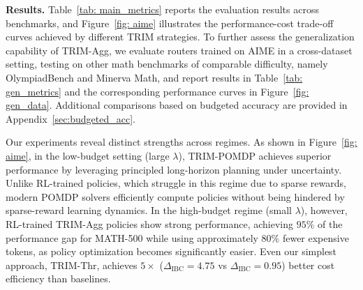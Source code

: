 \documentclass{article}
\theoremstyle{plain}
\theoremstyle{definition}
\theoremstyle{remark}
\newcommand{\ignore}[1]{}
\begin{document}
\textbf{Results.} Table~\ref{tab: main_metrics} reports the evaluation results across benchmarks, and Figure~\ref{fig: aime} illustrates the performance-cost trade-off curves achieved by different TRIM strategies. To further assess the generalization capability of TRIM-Agg, we evaluate routers trained on AIME in a cross-dataset setting, testing on other math benchmarks of comparable difficulty, namely OlympiadBench and Minerva Math, and report results in Table~\ref{tab: gen_metrics} and the corresponding performance curves in Figure~\ref{fig: gen_data}. Additional comparisons based on budgeted accuracy are provided in Appendix~\ref{sec:budgeted_acc}.

\ignore{Our experiments reveal distinct strengths across regimes. In the low-budget setting (large $\lambda$), TRIM-POMDP achieves superior performance, benefiting from principled long-horizon planning under uncertainty. Unlike RL-trained policies, which struggle in this regime due to sparse rewards, modern POMDP solvers efficiently compute policies without being hindered by sparse-reward learning dynamics. In the high-budget regime, however, RL-trained TRIM-Agg policies show strong performance, as policy optimization becomes significantly easier. Beyond budget regimes, our cross-dataset evaluations highlight an important distinction: query-level routers can often overfit to the intrinsic characteristics of specific datasets, while TRIM captures transferable routing behaviors that generalize across benchmarks of comparable difficulty. This suggests that step-level difficulty patterns reflect fundamental properties of multi-step reasoning rather than artifacts of individual datasets or models.

Despite being trained on fewer than 500 samples from the AIME dataset, TRIM-Agg achieves strong performance on the held-out test set and exhibits robust generalization to datasets of comparable difficulty, consistently surpassing both TRIM-Thr and query-level baselines. In parallel, TRIM-POMDP shows strong performance across all cost–performance trade-off regimes on both MATH-500 and AIME, despite its observation function being trained on different (but comparably difficult) math datasets and the solver requiring only the estimated next-step accuracies of $(M_w, M_s)$ as input.}

Our experiments reveal distinct strengths across regimes. As shown in Figure~\ref{fig: aime}, in the low-budget setting (large $\lambda$), TRIM-POMDP achieves superior performance by leveraging principled long-horizon planning under uncertainty. Unlike RL-trained policies, which struggle in this regime due to sparse rewards, modern POMDP solvers efficiently compute policies without being hindered by sparse-reward learning dynamics. In the high-budget regime (small $\lambda$), however, RL-trained TRIM-Agg policies show strong performance, achieving $95\%$ of the performance gap for MATH-500 while using approximately $80\%$ fewer expensive tokens, as policy optimization becomes significantly easier. Even our simplest approach, TRIM-Thr, achieves $5\times$ ($\Delta_{\text{IBC}} = 4.75$  vs $\Delta_{\text{IBC}} = 0.95$) better cost efficiency than baselines. 
\end{document}
